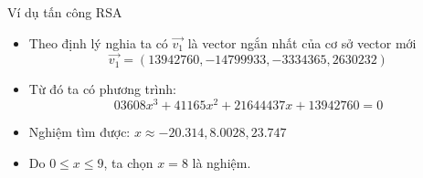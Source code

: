 \begin{frame}{Ví dụ tấn công RSA}

\begin{itemize}
\item Theo định lý nghia ta có $\vec{v_1}$ là vector ngắn nhất của cơ sở vector mới
\[
\vec{v_1} = (13942760, -14799933, -3334365, 2630232)
\]
\item Từ đó ta có phương trình:
\[
03608x^3 + 41165x^2 + 21644437x + 13942760 = 0
\]
\item Nghiệm tìm được: $x \approx -20.314, 8.0028, 23.747$
\item Do $0 \leq x \leq 9$, ta chọn $x = 8$ là nghiệm.
\end{itemize}

\end{frame}



